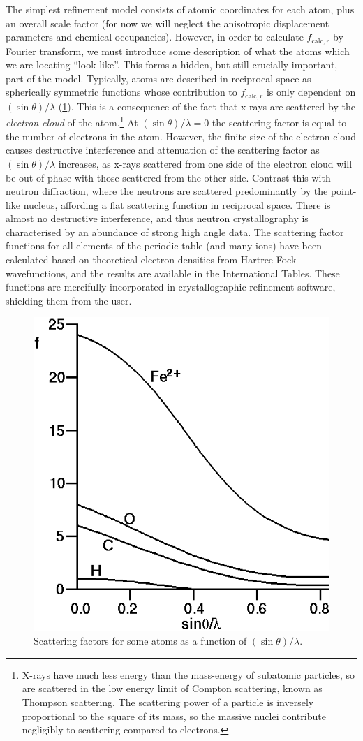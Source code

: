 \begin{refsection}
The simplest refinement model consists of atomic coordinates for each atom, plus an overall scale factor (for now we will neglect the anisotropic displacement parameters and chemical occupancies).
However, in order to calculate $f_{\mathrm{calc}, r}$ by Fourier transform, we must introduce some description of what the atoms which we are locating ``look like''.
This forms a hidden, but still crucially important, part of the model.
Typically, atoms are described in reciprocal space as spherically symmetric functions whose contribution to $f_{\mathrm{calc}, r}$ is only dependent on $(\sin\theta)/\lambda$ (\cref{fig:scatterf}).
This is a consequence of the fact that x-rays are scattered by the \emph{electron cloud} of the atom.\footnote{X-rays have much less energy than the mass-energy of subatomic particles, so are scattered in the low energy limit of Compton scattering, known as Thompson scattering.
The scattering power of a particle is inversely proportional to the square of its mass, so the massive nuclei contribute negligibly to scattering compared to electrons.}
At $(\sin\theta)/\lambda = 0$ the scattering factor is equal to the number of electrons in the atom.
However, the finite size of the electron cloud causes destructive interference and attenuation of the scattering factor as $(\sin\theta)/\lambda$ increases, as x-rays scattered from one side of the electron cloud will be out of phase with those scattered from the other side.
Contrast this with neutron diffraction, where the neutrons are scattered predominantly by the point-like nucleus, affording a flat scattering function in reciprocal space.
There is almost no destructive interference, and thus neutron crystallography is characterised by an abundance of strong high angle data.
The scattering factor functions for all elements of the periodic table (and many ions) have been calculated based on theoretical electron densities from Hartree-Fock wavefunctions, and the results are available in the International Tables.\autocite{IntTabCIntensityofdiffractedintensities}
These functions are mercifully incorporated in crystallographic refinement software, shielding them from the user.

\begin{figure}
    \centering
    \includegraphics[width=0.5\linewidth]{Figures/scatterf.png}
    \caption{Scattering factors for some atoms as a function of $(\sin\theta)/\lambda$.}
    \label{fig:scatterf}
\end{figure}


\end{refsection}
